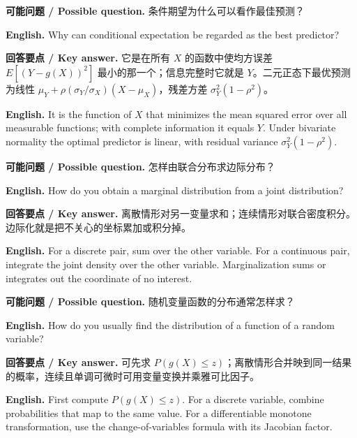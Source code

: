 \documentclass[UTF8,11pt,a4paper]{ctexart}
\newcommand{\EN}[1]{\par\noindent\textbf{English.} #1\par}
\newcommand{\ASK}[4]{\par\noindent\textbf{可能问题 / Possible question.} #1\par\EN{#2}\noindent\textbf{回答要点 / Key answer.} #3\par\EN{#4}\medskip}
\begin{document}
\ASK{条件期望为什么可以看作最佳预测？}{Why can conditional expectation be regarded as the best predictor?}{它是在所有 $X$ 的函数中使均方误差 $E[(Y-g(X))^2]$ 最小的那一个；信息完整时它就是 $Y$。二元正态下最优预测为线性 $\mu_Y+\rho(\sigma_Y/\sigma_X)(X-\mu_X)$，残差方差 $\sigma_Y^2(1-\rho^2)$。}{It is the function of $X$ that minimizes the mean squared error over all measurable functions; with complete information it equals $Y$. Under bivariate normality the optimal predictor is linear, with residual variance $\sigma_Y^2(1-\rho^2)$.}

\ASK{怎样由联合分布求边际分布？}{How do you obtain a marginal distribution from a joint distribution?}{离散情形对另一变量求和；连续情形对联合密度积分。边际化就是把不关心的坐标累加或积分掉。}{For a discrete pair, sum over the other variable. For a continuous pair, integrate the joint density over the other variable. Marginalization sums or integrates out the coordinate of no interest.}

\ASK{随机变量函数的分布通常怎样求？}{How do you usually find the distribution of a function of a random variable?}{可先求 $P(g(X)\le z)$；离散情形合并映到同一结果的概率，连续且单调可微时可用变量变换并乘雅可比因子。}{First compute $P(g(X)\le z)$. For a discrete variable, combine probabilities that map to the same value. For a differentiable monotone transformation, use the change-of-variables formula with its Jacobian factor.}
\end{document}
